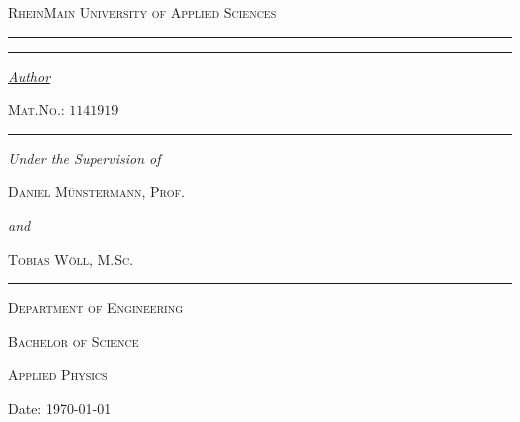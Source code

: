 \begin{titlepage}
	\newcommand{\HRule}{\rule{\linewidth}{0.5mm}}
	\centering
	\textsc{\Large RheinMain University of Applied Sciences} \par

	\begin{center}
		
	\end{center}
	\textsc{\LARGE \titleLV}\vspace{0.5cm}
	\HRule\vspace{0.6cm}
	{\huge\bfseries \subtitleA}\par\vspace{0.4cm} %
	{\huge\bfseries \subtitleB}\par\vspace{0.4cm}
	\HRule\vspace{1.5cm}
	\begin{minipage}{0.4\textwidth}
		\centering
		\Large
		\textit{\underline{Author}}\par\vspace{0.5cm}
		\textsc{\nameA}\par\vspace{0.25cm}
		\large
		\textsc{Mat.No.: \(1141919\)}\par\vspace{2cm}
	\end{minipage}
	\begin{minipage}{0.6\textwidth}
		\centering
		\large
		{\rule{.5cm}{.1pt}}\par\vspace{0.5cm}
		\textit{Under the Supervision of}\par\vspace{0.5cm}
		\textsc{Daniel Münstermann, Prof.}\par\vspace{0.5cm}
		\textit{and}\par\vspace{0.5cm}
		\textsc{Tobias Wöll, M.Sc.}\par\vspace{0.5cm}
		{\rule[5pt]{.5cm}{.1pt}}
	\end{minipage}
	\vfill\vfill\vfill
	\textsc{\Large Department of Engineering}\par\vspace{0.5cm}\par
	\textsc{\large Bachelor of Science}\par\vspace{0.5cm}
	\textsc{\large Applied Physics}\par\vspace{0.2cm}
	\vfill
	\begin{flushleft}
		Date:\hspace{0.4cm} {\large\today}
	\end{flushleft}
\end{titlepage}